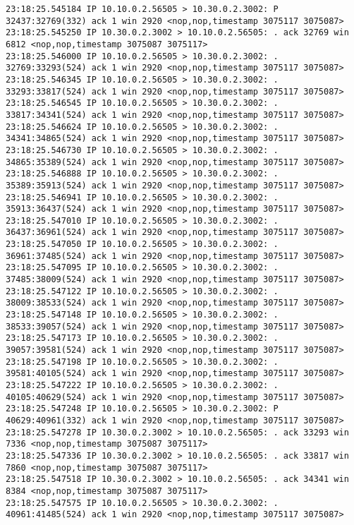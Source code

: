 \documentclass[a4paper,12pt]{article}
\begin{document}
\begin{Verbatim}
23:18:25.545184 IP 10.10.0.2.56505 > 10.30.0.2.3002: P 32437:32769(332) ack 1 win 2920 <nop,nop,timestamp 3075117 3075087>
23:18:25.545250 IP 10.30.0.2.3002 > 10.10.0.2.56505: . ack 32769 win 6812 <nop,nop,timestamp 3075087 3075117>
23:18:25.546000 IP 10.10.0.2.56505 > 10.30.0.2.3002: . 32769:33293(524) ack 1 win 2920 <nop,nop,timestamp 3075117 3075087>
23:18:25.546345 IP 10.10.0.2.56505 > 10.30.0.2.3002: . 33293:33817(524) ack 1 win 2920 <nop,nop,timestamp 3075117 3075087>
23:18:25.546545 IP 10.10.0.2.56505 > 10.30.0.2.3002: . 33817:34341(524) ack 1 win 2920 <nop,nop,timestamp 3075117 3075087>
23:18:25.546624 IP 10.10.0.2.56505 > 10.30.0.2.3002: . 34341:34865(524) ack 1 win 2920 <nop,nop,timestamp 3075117 3075087>
23:18:25.546730 IP 10.10.0.2.56505 > 10.30.0.2.3002: . 34865:35389(524) ack 1 win 2920 <nop,nop,timestamp 3075117 3075087>
23:18:25.546888 IP 10.10.0.2.56505 > 10.30.0.2.3002: . 35389:35913(524) ack 1 win 2920 <nop,nop,timestamp 3075117 3075087>
23:18:25.546941 IP 10.10.0.2.56505 > 10.30.0.2.3002: . 35913:36437(524) ack 1 win 2920 <nop,nop,timestamp 3075117 3075087>
23:18:25.547010 IP 10.10.0.2.56505 > 10.30.0.2.3002: . 36437:36961(524) ack 1 win 2920 <nop,nop,timestamp 3075117 3075087>
23:18:25.547050 IP 10.10.0.2.56505 > 10.30.0.2.3002: . 36961:37485(524) ack 1 win 2920 <nop,nop,timestamp 3075117 3075087>
23:18:25.547095 IP 10.10.0.2.56505 > 10.30.0.2.3002: . 37485:38009(524) ack 1 win 2920 <nop,nop,timestamp 3075117 3075087>
23:18:25.547122 IP 10.10.0.2.56505 > 10.30.0.2.3002: . 38009:38533(524) ack 1 win 2920 <nop,nop,timestamp 3075117 3075087>
23:18:25.547148 IP 10.10.0.2.56505 > 10.30.0.2.3002: . 38533:39057(524) ack 1 win 2920 <nop,nop,timestamp 3075117 3075087>
23:18:25.547173 IP 10.10.0.2.56505 > 10.30.0.2.3002: . 39057:39581(524) ack 1 win 2920 <nop,nop,timestamp 3075117 3075087>
23:18:25.547198 IP 10.10.0.2.56505 > 10.30.0.2.3002: . 39581:40105(524) ack 1 win 2920 <nop,nop,timestamp 3075117 3075087>
23:18:25.547222 IP 10.10.0.2.56505 > 10.30.0.2.3002: . 40105:40629(524) ack 1 win 2920 <nop,nop,timestamp 3075117 3075087>
23:18:25.547248 IP 10.10.0.2.56505 > 10.30.0.2.3002: P 40629:40961(332) ack 1 win 2920 <nop,nop,timestamp 3075117 3075087>
23:18:25.547278 IP 10.30.0.2.3002 > 10.10.0.2.56505: . ack 33293 win 7336 <nop,nop,timestamp 3075087 3075117>
23:18:25.547336 IP 10.30.0.2.3002 > 10.10.0.2.56505: . ack 33817 win 7860 <nop,nop,timestamp 3075087 3075117>
23:18:25.547518 IP 10.30.0.2.3002 > 10.10.0.2.56505: . ack 34341 win 8384 <nop,nop,timestamp 3075087 3075117>
23:18:25.547575 IP 10.10.0.2.56505 > 10.30.0.2.3002: . 40961:41485(524) ack 1 win 2920 <nop,nop,timestamp 3075117 3075087>

\end{Verbatim}
\end{document}
